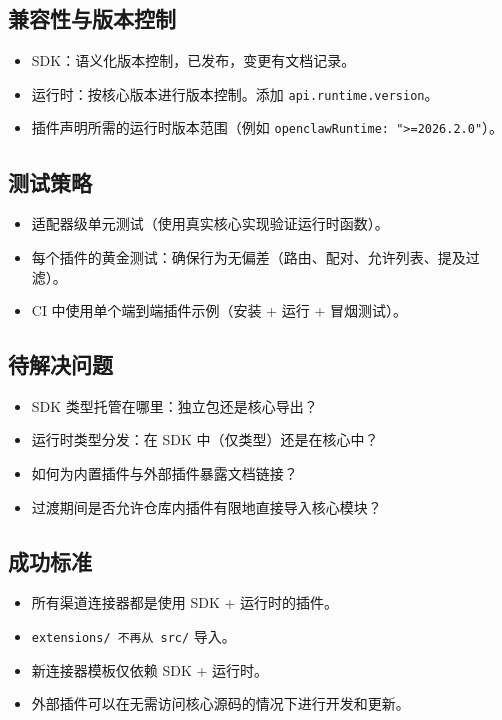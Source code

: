 \subsection{兼容性与版本控制}


\begin{itemize}
  \item SDK：语义化版本控制，已发布，变更有文档记录。
  \item 运行时：按核心版本进行版本控制。添加 \texttt{api.runtime.version}。
  \item 插件声明所需的运行时版本范围（例如 \texttt{openclawRuntime: ">=2026.2.0"}）。
\end{itemize}


\subsection{测试策略}


\begin{itemize}
  \item 适配器级单元测试（使用真实核心实现验证运行时函数）。
  \item 每个插件的黄金测试：确保行为无偏差（路由、配对、允许列表、提及过滤）。
  \item CI 中使用单个端到端插件示例（安装 + 运行 + 冒烟测试）。
\end{itemize}


\subsection{待解决问题}


\begin{itemize}
  \item SDK 类型托管在哪里：独立包还是核心导出？
  \item 运行时类型分发：在 SDK 中（仅类型）还是在核心中？
  \item 如何为内置插件与外部插件暴露文档链接？
  \item 过渡期间是否允许仓库内插件有限地直接导入核心模块？
\end{itemize}


\subsection{成功标准}


\begin{itemize}
  \item 所有渠道连接器都是使用 SDK + 运行时的插件。
  \item \texttt{extensions/\textbf{} 不再从 \texttt{src/}} 导入。
  \item 新连接器模板仅依赖 SDK + 运行时。
  \item 外部插件可以在无需访问核心源码的情况下进行开发和更新。
\end{itemize}


